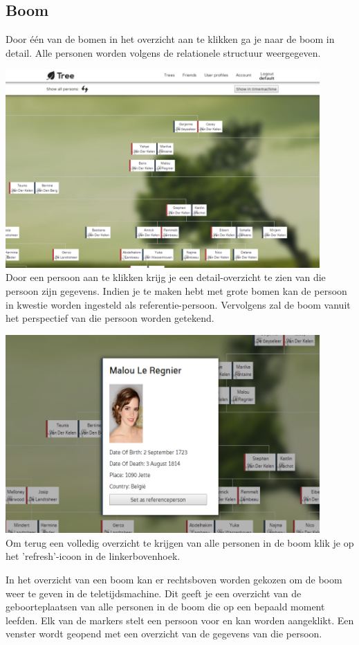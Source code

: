 \documentclass[pdftex,a4paper,12pt,twoside]{report}
\begin{document}
\subsection{Boom}
Door één van de bomen in het overzicht aan te klikken ga je naar de boom in detail. Alle personen worden volgens de relationele structuur weergegeven.

\includegraphics[width=12cm]{images/web_tree.png}\\[.5cm]
Door een persoon aan te klikken krijg je een detail-overzicht te zien van die persoon zijn gegevens. Indien je te maken hebt met grote bomen kan de persoon in kwestie worden ingesteld als referentie-persoon. Vervolgens zal de boom vanuit het perspectief van die persoon worden getekend.

\includegraphics[width=12cm]{images/web_treedetail.png}\\[.5cm]
Om terug een volledig overzicht te krijgen van alle personen in de boom klik je op het 'refresh'-icoon in de linkerbovenhoek.

In het overzicht van een boom kan er rechtsboven worden gekozen om de boom weer te geven in de teletijdsmachine. Dit geeft je een overzicht van de geboorteplaatsen van alle personen in de boom die op een bepaald moment leefden. Elk van de markers stelt een persoon voor en kan worden aangeklikt. Een venster wordt geopend met een overzicht van de gegevens van die persoon.
\end{document}

